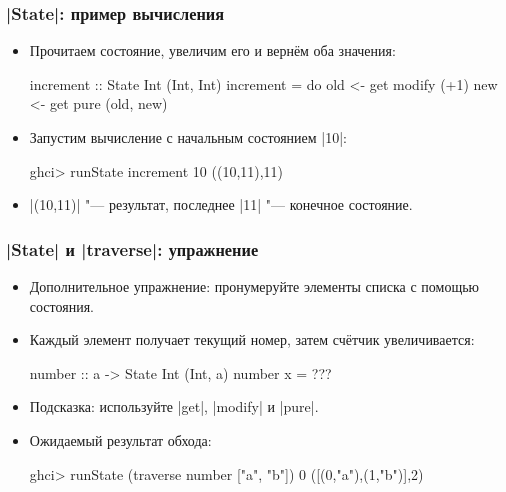 \documentclass[11pt]{beamer}
\begin{document}
\begin{frame}[fragile]
  \frametitle{\haskinline|State|: пример вычисления}
  \begin{itemize}
    \item Прочитаем состояние, увеличим его и вернём оба значения:
          \begin{haskell}
            increment :: State Int (Int, Int)
            increment = do
              old <- get
              modify (+1)
              new <- get
              pure (old, new)
          \end{haskell}
          \pause
    \item Запустим вычисление с начальным состоянием \haskinline|10|:
          \begin{haskell}
            ghci> runState increment 10
            ((10,11),11)
          \end{haskell}
    \item \haskinline|(10,11)| "--- результат, последнее \haskinline|11| "--- конечное состояние.
  \end{itemize}
\end{frame}

\begin{frame}[fragile]
  \frametitle{\haskinline|State| и \haskinline|traverse|: упражнение}
  \begin{itemize}
    \item Дополнительное упражнение: пронумеруйте элементы списка с помощью состояния.
    \item Каждый элемент получает текущий номер, затем счётчик увеличивается:
          \begin{haskell}
            number :: a -> State Int (Int, a)
            number x = ???
          \end{haskell}
    \item Подсказка: используйте \haskinline|get|, \haskinline|modify| и \haskinline|pure|.
          \pause
    \item Ожидаемый результат обхода:
          \begin{haskellsmall}
            ghci> runState (traverse number ["a", "b"]) 0
            ([(0,"a"),(1,"b")],2)
          \end{haskellsmall}
  \end{itemize}
\end{frame}
\end{document}
